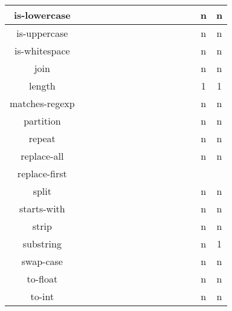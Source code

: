 \documentclass[anonymous,sigplan,review,11pt,nonacm,natbib=false]{acmart}
\begin{document}
\begin{table*}[]
\begin{tabular}{|c||c|c|c|c|c|c|c|c|c|c|c|c|c|c|}
            is-lowercase &  &  &  &  &  &  &  &  &  &  &  &  & n & n \\ \hline

            is-uppercase &  &  &  &  &  &  &  &  &  &  &  &  & n & n \\ \hline

            is-whitespace &  &  &  &  &  &  &  &  &  &  &  &  & n & n \\ \hline

            join &  &  &  &  &  &  &  &  &  &  &  &  & n & n \\ \hline

            length &  &  &  &  &  &  &  &  &  &  &  &  & 1 & 1 \\ \hline

            matches-regexp &  &  &  &  &  &  &  &  &  &  &  &  & n & n \\ \hline

            partition &  &  &  &  &  &  &  &  &  &  &  &  & n & n \\ \hline

            repeat &  &  &  &  &  &  &  &  &  &  &  &  & n & n \\ \hline

            replace-all &  &  &  &  &  &  &  &  &  &  &  &  & n & n \\ \hline

            replace-first &  &  &  &  &  &  &  &  &  &   &  &  &  & \\ \hline

            split &  &  &  &  &  &  &  &  &  &  &  &  & n & n \\ \hline

            starts-with &  &  &  &  &  &  &  &  &  &  &  &  & n & n \\ \hline

            strip &  &  &  &  &  &  &  &  &  &  &  &  & n & n \\ \hline

            substring &  &  &  &  &  &  &  &  &  &  &  &  & n & 1 \\ \hline

            swap-case &  &  &  &  &  &  &  &  &  &  &  &  & n & n \\ \hline

            to-float &  &  &  &  &  &  &  &  &  &  &  &  & n & n \\ \hline

            to-int &  &  &  &  &  &  &  &  &  &  &  &  & n & n \\ \hline


\end{tabular}
\end{table*}
\end{document}
